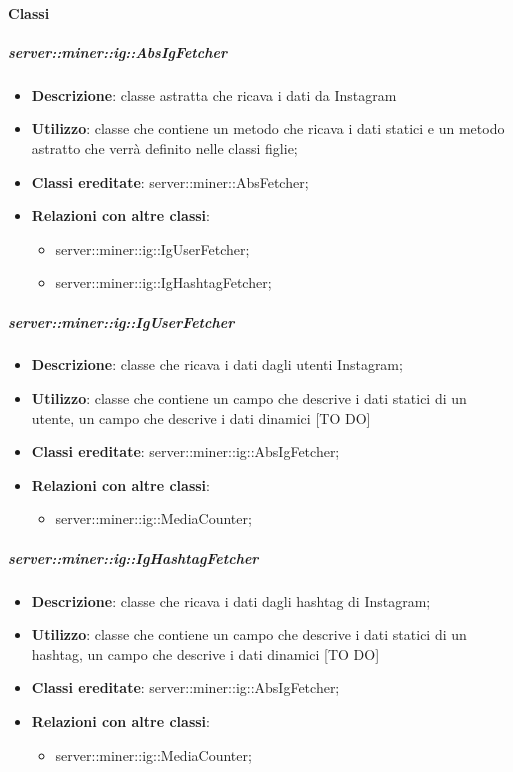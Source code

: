 	\paragraph{Classi} %
	\subparagraph{server::miner::ig::AbsIgFetcher} %
		\label{subp:server_miner_ig_AbsIgFetcher}
			\begin{itemize}
				\item \textbf{Descrizione}: classe astratta che ricava i dati da Instagram
				\item \textbf{Utilizzo}: classe che contiene un metodo che ricava i dati statici e un metodo astratto che verrà definito nelle classi figlie;
				\item \textbf{Classi ereditate}: server::miner::AbsFetcher;				
				\item \textbf{Relazioni con altre classi}:
					\begin{itemize}
						\item server::miner::ig::IgUserFetcher;
						\item server::miner::ig::IgHashtagFetcher;
					\end{itemize}
			\end{itemize}

	\subparagraph{server::miner::ig::IgUserFetcher} %
		\label{subp:server_miner_ig_IgUserFetcher}
			\begin{itemize}
				\item \textbf{Descrizione}: classe che ricava i dati dagli utenti Instagram;
				\item \textbf{Utilizzo}: classe che contiene un campo che descrive i dati statici di un utente, un campo che descrive i dati dinamici [TO DO]
				\item \textbf{Classi ereditate}: server::miner::ig::AbsIgFetcher;				
				\item \textbf{Relazioni con altre classi}:
					\begin{itemize}
						\item server::miner::ig::MediaCounter;
					\end{itemize}
			\end{itemize}
		
	\subparagraph{server::miner::ig::IgHashtagFetcher} %
		\label{subp:server_miner_ig_IgHashtagFetcher}
			\begin{itemize}
				\item \textbf{Descrizione}: classe che ricava i dati dagli hashtag di Instagram;
				\item \textbf{Utilizzo}: classe che contiene un campo che descrive i dati statici di un hashtag, un campo che descrive i dati dinamici [TO DO]
				\item \textbf{Classi ereditate}: server::miner::ig::AbsIgFetcher;				
				\item \textbf{Relazioni con altre classi}:
					\begin{itemize}
						\item server::miner::ig::MediaCounter;
					\end{itemize}
			\end{itemize}
		

